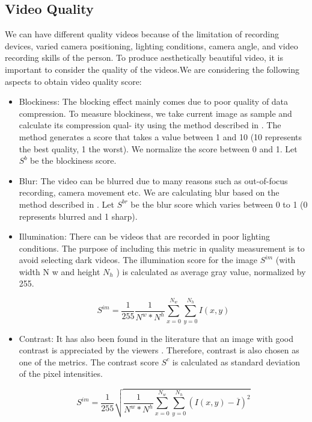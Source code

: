 \documentclass{new}
\begin{document}
\subsection{Video Quality}
We can have different quality videos because of the limitation of
recording devices, varied camera positioning, lighting conditions,
camera angle, and video recording skills of the person. To produce
aesthetically beautiful video, it is important to consider the quality
of the videos.We are considering the following aspects to obtain
video quality score:

\begin{itemize}
\item Blockiness: The blocking effect mainly comes due to poor
quality of data compression. To measure blockiness, we take
current image as sample and calculate its compression qual-
ity using the method described in \cite{18}. The method generates
a score that takes a value between 1 and 10 (10 represents the
best quality, 1 the worst). We normalize the score between 0
and 1. Let $S^b$ be the blockiness score.

\item Blur: The video can be blurred due to many reasons such as
out-of-focus recording, camera movement etc. We are calculating blur based on the method described in \cite{5}. Let $S^{br}$
be the blur score which varies between 0 to 1 (0 represents
blurred and 1 sharp).

\item Illumination: There can be videos that are recorded in poor
lighting conditions. The purpose of including this metric in
quality measurement is to avoid selecting dark videos. The
illumination score for the image $S^{im}$ (with width N w and
height $N_h$ ) is calculated as average gray value, normalized
by 255.

\begin{equation}  
S^{im} = \frac{1}{255}\frac{1}{N^w * N^h}\sum_{x=0}^{N_w}\sum_{y=0}^{N_h}I(x,y)
\end{equation}

\item Contrast: It has also been found in the literature that an image with good contrast is appreciated by the viewers \cite{10}.
Therefore, contrast is also chosen as one of the metrics. The
contrast score $S^c$ is calculated as standard deviation of the
pixel intensities.

\begin{equation}  
S^{im} = \frac{1}{255}\sqrt{\frac{1}{N^w * N^h}\sum_{x=0}^{N_w}\sum_{y=0}^{N_h}(I(x,y) - \overline{I})^2}
\end{equation}


\end{itemize}
\end{document}
